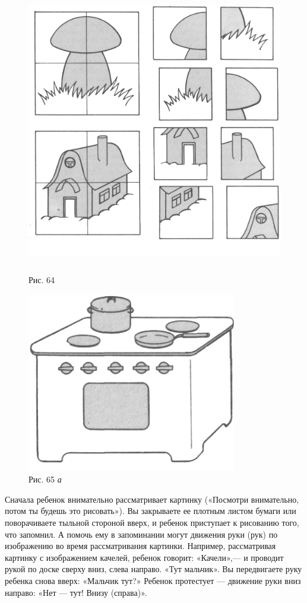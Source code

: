 \documentclass{book}
\renewcommand{\emph}[1]{\textit{#1}}
\begin{document}
\begin{figure}
\centering
\includegraphics[width=4.90972in,height=4.94306in]{media/media/image61.jpg}
\caption*{Рис. 64}
\end{figure}

\begin{figure}
\centering
\includegraphics[width=3.60733in,height=3.10321in]{media/media/image62.jpg}
\caption*{Рис. 65 \emph{а}}
\end{figure}

Сначала ребенок внимательно рассматривает картинку («Посмотри
внимательно, потом ты будешь это рисовать»). Вы закрываете ее плотным
листом бумаги или поворачиваете тыльной стороной вверх, и ребенок
приступает к рисованию того, что запомнил. А помочь ему в запоминании
могут движения руки (рук) по изображению во время рассматривания
картинки. Например, рассматривая картинку с изображением качелей,
ребенок говорит: «Качели»,--- и проводит рукой по доске сверху вниз,
слева направо. «Тут мальчик». Вы передвигаете руку ребенка снова вверх:
«Мальчик тут?» Ребенок протестует --- движение руки вниз направо: «Нет
--- тут! Внизу (справа)».
\end{document}
